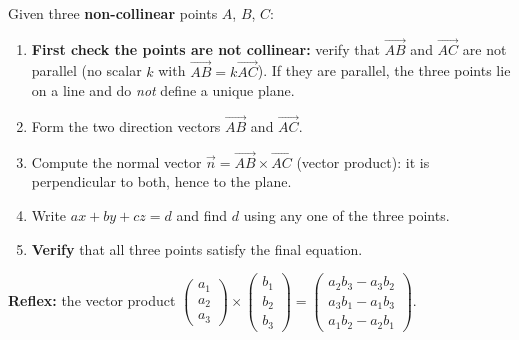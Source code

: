 \documentclass[11pt]{article}
\begin{document}
\begin{methode}
Given three \textbf{non-collinear} points $A$, $B$, $C$:
\begin{enumerate}
\item \textbf{First check the points are not collinear:} verify that $\vec{AB}$ and $\vec{AC}$ are not parallel (no scalar $k$ with $\vec{AB} = k\vec{AC}$). If they are parallel, the three points lie on a line and do \emph{not} define a unique plane.
\item Form the two direction vectors $\vec{AB}$ and $\vec{AC}$.
\item Compute the normal vector $\vec{n} = \vec{AB} \times \vec{AC}$ (vector product): it is perpendicular to both, hence to the plane.
\item Write $ax+by+cz = d$ and find $d$ using any one of the three points.
\item \textbf{Verify} that all three points satisfy the final equation.
\end{enumerate}
\textbf{Reflex:} the vector product $\begin{pmatrix} a_1 \\ a_2 \\ a_3 \end{pmatrix} \times \begin{pmatrix} b_1 \\ b_2 \\ b_3 \end{pmatrix} = \begin{pmatrix} a_2b_3 - a_3b_2 \\ a_3b_1 - a_1b_3 \\ a_1b_2 - a_2b_1 \end{pmatrix}$.
\end{methode}
\end{document}
